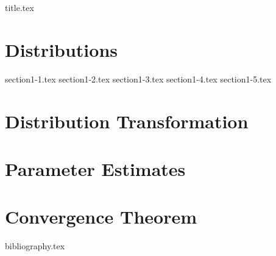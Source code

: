 \documentclass[a4paper,11pt]{book}
\theoremstyle{definition}
\theoremstyle{remark}
\begin{document}
\frontmatter
{title.tex}
\clearpage

\tableofcontents

\mainmatter

\chapter{Distributions}

{section1-1.tex}
{section1-2.tex}
{section1-3.tex}
{section1-4.tex}
{section1-5.tex}

\chapter{Distribution Transformation}


\chapter{Parameter Estimates}




\chapter{Convergence Theorem}




\backmatter

{bibliography.tex}
\end{document}
